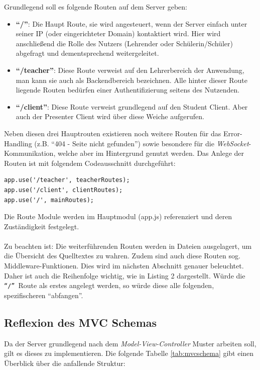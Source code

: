 Grundlegend soll es folgende Routen auf dem Server geben:
\begin{itemize}
	\item \textbf{"`/"'}: Die Haupt Route, sie wird angesteuert, wenn der Server einfach unter seiner IP (oder eingerichteter Domain) kontaktiert wird. Hier wird anschließend die Rolle des Nutzers (Lehrender oder Schülerin/Schüler) abgefragt  und dementsprechend weitergeleitet.
	\item \textbf{"`/teacher"'}: Diese Route verweist auf den Lehrerbereich der Anwendung, man kann sie auch als Backendbereich bezeichnen. Alle hinter dieser Route liegende Routen bedürfen einer Authentifizierung seitens des Nutzenden.
	\item \textbf{"`/client"'}: Diese Route verweist grundlegend auf den Student Client. Aber auch der Presenter Client wird über diese Weiche aufgerufen. 
\end{itemize}
Neben diesen drei Hauptrouten existieren noch weitere Routen für das Error-Handling (z.B. "`404 - Seite nicht gefunden"') sowie besondere für die \emph{WebSocket}-Kommunikation, welche aber im Hintergrund genutzt werden.
Das Anlege der Routen ist mit folgendem Codeausschnitt durchgeführt:
\begin{lstlisting}[caption=Anlegen der Routen]
app.use('/teacher', teacherRoutes);
app.use('/client', clientRoutes);
app.use('/', mainRoutes);
\end{lstlisting}

\footnotesize{Die Route Module werden im Hauptmodul (app.js) referenziert und deren Zuständigkeit festgelegt.} \\ \\
\normalsize
Zu beachten ist: Die weiterführenden Routen werden in Dateien ausgelagert, um die Übersicht des Quelltextes zu wahren. Zudem sind auch diese Routen sog. Middleware-Funktionen. Dies wird im nächsten Abschnitt genauer beleuchtet. Daher ist auch die Reihenfolge wichtig, wie in Listing 2 dargestellt. Würde die \texttt{"`/"'}~Route als erstes angelegt werden, so würde diese alle folgenden, spezifischeren "`abfangen"'.  

\newpage
\subsection{Reflexion des MVC Schemas}\label{sec:mvc}
Da der Server grundlegend nach dem \emph{Model-View-Controller} Muster  arbeiten soll, gilt es dieses zu implementieren. Die folgende Tabelle \ref{tab:mvcschema} gibt einen Überblick über die anfallende Struktur:

